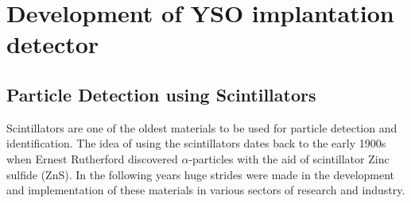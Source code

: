 \documentclass[a4paper,12pt,twoside]{report}
\begin{document}
\chapter{Development of YSO implantation detector}

\section{Particle Detection using Scintillators}
Scintillators are one of the oldest materials to be used for particle detection and identification. The idea of using the scintillators dates back to the early 1900s \cite{rutherford} when Ernest Rutherford discovered $\alpha$-particles with the aid of scintillator Zinc sulfide (ZnS). In the following years huge strides were made in the development and implementation of these materials in various sectors of research and industry.\\
\end{document}
